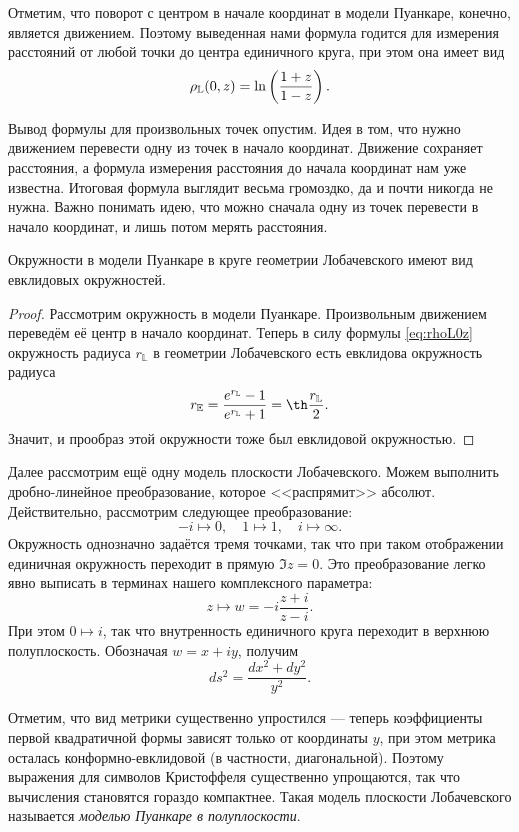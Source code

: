 Отметим, что поворот с центром в начале координат в модели Пуанкаре, конечно, является движением. Поэтому выведенная нами формула годится для измерения расстояний от любой точки до центра единичного круга, при этом она имеет вид
\begin{equation} \label{eq:rhoL0z}
	\rho_{\mathbb{L}}(0, z) = \ln\left(\frac{1 + z}{1 - z}\right).
\end{equation}

Вывод формулы для произвольных точек опустим. Идея в том, что нужно движением перевести одну из точек в начало координат. Движение сохраняет расстояния, а формула измерения расстояния до начала координат нам уже известна. Итоговая формула выглядит весьма громоздко, да и почти никогда не нужна. Важно понимать идею, что можно сначала одну из точек перевести в начало координат, и лишь потом мерять расстояния.

\begin{proposition}
	Окружности в модели Пуанкаре в круге геометрии Лобачевского имеют вид евклидовых окружностей.
\end{proposition}

\begin{proof}
	Рассмотрим окружность в модели Пуанкаре. Произвольным движением переведём её центр в начало координат. Теперь в силу формулы \eqref{eq:rhoL0z} окружность радиуса $r_{\mathbb{L}}$ в геометрии Лобачевского есть евклидова окружность радиуса
	\begin{equation} \label{eq:LtoE}
		r_{\mathbb{E}} = \frac{e^{r_{\mathbb{L}}} - 1}{e^{r_{\mathbb{L}}} + 1} = \th\frac{r_{\mathbb{L}}}{2}.
	\end{equation}
	Значит, и прообраз этой окружности тоже был евклидовой окружностью.
\end{proof}

Далее рассмотрим ещё одну модель плоскости Лобачевского. Можем выполнить дробно-линейное преобразование, которое <<распрямит>> абсолют. Действительно, рассмотрим следующее преобразование:
\[
	-i \mapsto 0,\quad 1 \mapsto 1,\quad i \mapsto \infty.
\]
Окружность однозначно задаётся тремя точками, так что при таком отображении единичная окружность переходит в прямую $\Im z = 0$. Это преобразование легко явно выписать в терминах нашего комплексного параметра:
\[
	z \mapsto w = -i\frac{z + i}{z - i}.
\]
При этом $0 \mapsto i$, так что внутренность единичного круга переходит в верхнюю полуплоскость. Обозначая $w = x + iy$, получим
\[
	ds^2 = \frac{dx^2 + dy^2}{y^2}.
\]

Отметим, что вид метрики существенно упростился --- теперь коэффициенты первой квадратичной формы зависят только от координаты $y$, при этом метрика осталась конформно-евклидовой (в частности, диагональной). Поэтому выражения для символов Кристоффеля существенно упрощаются, так что вычисления становятся гораздо компактнее. Такая модель плоскости Лобачевского называется \textit{моделью Пуанкаре в полуплоскости}.

